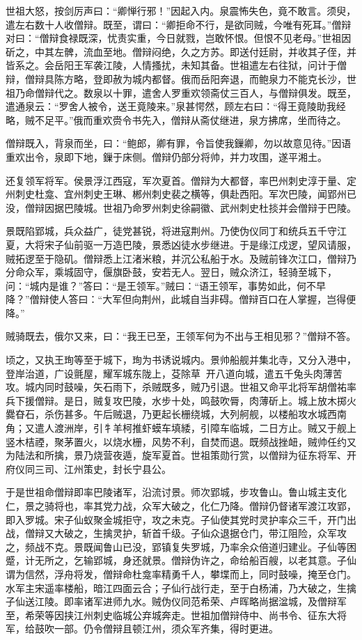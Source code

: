 \documentclass[12pt,UTF8]{ctexbook}
\begin{document}
世祖大怒，按剑厉声曰：“卿惮行邪！”因起入内。泉震怖失色，竟不敢言。须臾，遣左右数十人收僧辩。既至，谓曰：“卿拒命不行，是欲同贼，今唯有死耳。”僧辩对曰：“僧辩食禄既深，忧责实重，今日就戮，岂敢怀恨。但恨不见老母。”世祖因斫之，中其左髀，流血至地。僧辩闷绝，久之方苏。即送付廷尉，并收其子侄，并皆系之。会岳阳王军袭江陵，人情搔扰，未知其备。世祖遣左右往狱，问计于僧辩，僧辩具陈方略，登即赦为城内都督。俄而岳阳奔退，而鲍泉力不能克长沙，世祖乃命僧辩代之。数泉以十罪，遣舍人罗重欢领斋仗三百人，与僧辩俱发。既至，遣通泉云：“罗舍人被令，送王竟陵来。”泉甚愕然，顾左右曰：“得王竟陵助我经略，贼不足平。”俄而重欢赍令书先入，僧辩从斋仗继进，泉方拂席，坐而待之。

僧辩既入，背泉而坐，曰：“鲍郎，卿有罪，令旨使我鏁卿，勿以故意见待。”因语重欢出令，泉即下地，鏁于床侧。僧辩仍部分将帅，并力攻围，遂平湘土。

还复领军将军。侯景浮江西寇，军次夏首。僧辩为大都督，率巴州刺史淳于量、定州刺史杜龛、宜州刺史王琳、郴州刺史裴之横等，俱赴西阳。军次巴陵，闻郢州已没，僧辩因据巴陵城。世祖乃命罗州刺史徐嗣徽、武州刺史杜掞并会僧辩于巴陵。

景既陷郢城，兵众益广，徒党甚锐，将进寇荆州。乃使伪仪同丁和统兵五千守江夏，大将宋子仙前驱一万造巴陵，景悉凶徒水步继进。于是缘江戍逻，望风请服，贼拓逻至于隐矶。僧辩悉上江渚米粮，并沉公私船于水。及贼前锋次江口，僧辩乃分命众军，乘城固守，偃旗卧鼓，安若无人。翌日，贼众济江，轻骑至城下，问：“城内是谁？”答曰：“是王领军。”贼曰：“语王领军，事势如此，何不早降？”僧辩使人答曰：“大军但向荆州，此城自当非碍。僧辩百口在人掌握，岂得便降。”

贼骑既去，俄尔又来，曰：“我王已至，王领军何为不出与王相见邪？”僧辩不答。

顷之，又执王珣等至于城下，珣为书诱说城内。景帅船舰并集北寺，又分入港中，登岸治道，广设氈屋，耀军城东陇上，芟除草，开八道向城，遣五千兔头肉薄苦攻。城内同时鼓噪，矢石雨下，杀贼既多，贼乃引退。世祖又命平北将军胡僧祐率兵下援僧辩。是日，贼复攻巴陵，水步十处，鸣鼓吹脣，肉薄斫上。城上放木掷火爨昚石，杀伤甚多。午后贼退，乃更起长栅绕城，大列舸舰，以楼船攻水城西南角；又遣人渡洲岸，引牜羊柯推虾蟆车填緌，引障车临城，二日方止。贼又于舰上竖木桔禋，聚茅置火，以烧水栅，风势不利，自焚而退。既频战挫衄，贼帅任约又为陆法和所擒，景乃烧营夜遁，旋军夏首。世祖策勋行赏，以僧辩为征东将军、开府仪同三司、江州策史，封长宁县公。

于是世祖命僧辩即率巴陵诸军，沿流讨景。师次郢城，步攻鲁山。鲁山城主支化仁，景之骑将也，率其党力战，众军大破之，化仁乃降。僧辩仍督诸军渡江攻郢，即入罗城。宋子仙蚁聚金城拒守，攻之未克。子仙使其党时灵护率众三千，开门出战，僧辩又大破之，生擒灵护，斩首千级。子仙众退据仓门，带江阻险，众军攻之，频战不克。景既闻鲁山已没，郢镇复失罗城，乃率余众倍道归建业。子仙等困蹙，计无所之，乞输郢城，身还就景。僧辩伪许之，命给船百艘，以老其意。子仙谓为信然，浮舟将发，僧辩命杜龛率精勇千人，攀堞而上，同时鼓噪，掩至仓门。水军主宋遥率楼船，暗江四面云合；子仙行战行走，至于白杨浦，乃大破之，生擒子仙送江陵。即率诸军进师九水。贼伪仪同范希荣、卢晖略尚据湓城，及僧辩军至，希荣等因挟江州刺史临城公弃城奔走。世祖加僧辩侍中、尚书令、征东大将军，给鼓吹一部。仍令僧辩且顿江州，须众军齐集，得时更进。
\end{document}
